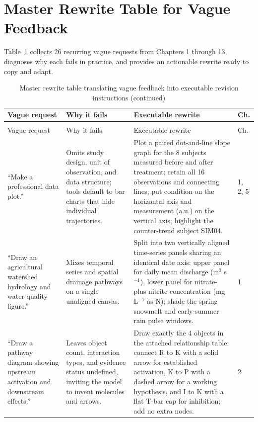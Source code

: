 \section{Master Rewrite Table for Vague Feedback}

Table~\ref{tab:app-b-rewrites} collects 26 recurring vague requests from Chapters 1 through 13, diagnoses why each fails in practice, and provides an actionable rewrite ready to copy and adapt.

\begingroup\small
\begin{longtable}{@{}p{26mm}p{28mm}p{56mm}p{10mm}@{}}
\caption{Master rewrite table translating vague feedback into executable revision instructions}\label{tab:app-b-rewrites}\\
\toprule
Vague request & Why it fails & Executable rewrite & Ch. \\
\midrule
\endfirsthead
\caption[]{Master rewrite table translating vague feedback into executable revision instructions (continued)}\\
\toprule
Vague request & Why it fails & Executable rewrite & Ch. \\
\midrule
\endhead
\bottomrule
\endfoot
``Make a professional data plot.'' & Omits study design, unit of observation, and data structure; tools default to bar charts that hide individual trajectories. & Plot a paired dot-and-line slope graph for the 8 subjects measured before and after treatment; retain all 16 observations and connecting lines; put condition on the horizontal axis and measurement (a.u.) on the vertical axis; highlight the counter-trend subject SIM04. & 1, 2, 5 \\
``Draw an agricultural watershed hydrology and water-quality figure.'' & Mixes temporal series and spatial drainage pathways on a single unaligned canvas. & Split into two vertically aligned time-series panels sharing an identical date axis: upper panel for daily mean discharge (m$^3$ s$^{-1}$), lower panel for nitrate-plus-nitrite concentration (mg L$^{-1}$ as N); shade the spring snowmelt and early-summer rain pulse windows. & 1 \\
``Draw a pathway diagram showing upstream activation and downstream effects.'' & Leaves object count, interaction types, and evidence status undefined, inviting the model to invent molecules and arrows. & Draw exactly the 4 objects in the attached relationship table: connect R to K with a solid arrow for established activation, K to P with a dashed arrow for a working hypothesis, and I to K with a flat T-bar cap for inhibition; add no extra nodes. & 2 \\

\end{longtable}

